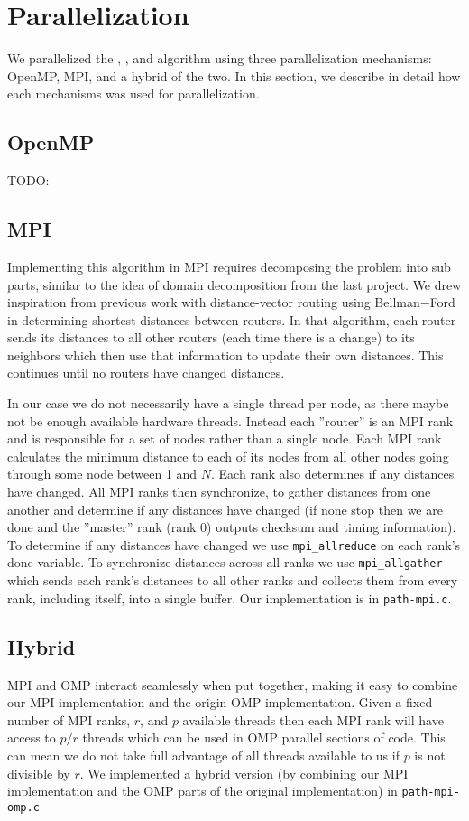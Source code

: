 \section{Parallelization}\label{sec:parallelization}
We parallelized the \rs{}, \block{}, and \fw{} algorithm using three
parallelization mechanisms: OpenMP, MPI, and a hybrid of the two. In this
section, we describe in detail how each mechanisms was used for parallelization.

\subsection{OpenMP}
TODO:

\subsection{MPI}
Implementing this algorithm in MPI requires decomposing the problem into sub
parts, similar to the idea of domain decomposition from the last project. We
drew inspiration from previous work with distance-vector routing using
Bellman$-$Ford in determining shortest distances between routers. In that
algorithm, each router sends its distances to all other routers (each time
there is a change) to its neighbors which then use that information to update
their own distances. This continues until no routers have changed distances.

In our case we do not necessarily have a single thread per node, as there maybe
not be enough available hardware threads. Instead each ''router'' is an MPI
rank and is responsible for a set of nodes rather than a single node. Each MPI
rank calculates the minimum distance to each of its nodes from all other nodes
going through some node between 1 and $N$. Each rank also determines if any
distances have changed. All MPI ranks then synchronize, to gather distances
from one another and determine if any distances have changed (if none stop then
we are done and the ''master'' rank (rank 0) outputs checksum and timing
information). To determine if any distances have changed we use
\texttt{mpi\_allreduce} on each rank's done variable. To synchronize distances
across all ranks we use \texttt{mpi\_allgather} which sends each rank's
distances to all other ranks and collects them from every rank, including
itself, into a single buffer. Our implementation is in \texttt{path-mpi.c}.

\subsection{Hybrid}
MPI and OMP interact seamlessly when put together, making it easy to combine
our MPI implementation and the origin OMP implementation. Given a fixed number
of MPI ranks, $r$, and $p$ available threads then each MPI rank will have
access to $p/r$ threads which can be used in OMP parallel sections of code.
This can mean we do not take full advantage of all threads available to us if
$p$ is not divisible by $r$. We implemented a hybrid version (by combining our
MPI implementation and the OMP parts of the original implementation) in
\texttt{path-mpi-omp.c}
